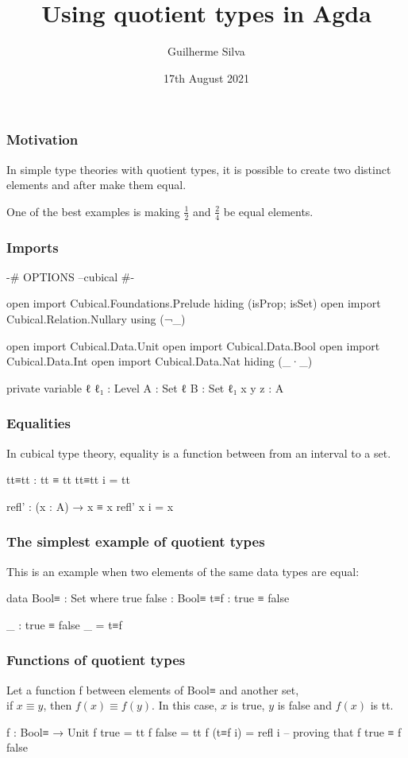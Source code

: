 \documentclass{beamer}
\title{Using quotient types in Agda}
\author{Guilherme Silva}
\institute{Scottish Programming Languages and Verification Summer School}
\date{17th August 2021}
\begin{document}
\frame{\titlepage}

\begin{frame}
  \frametitle{Motivation}
  In simple type theories with quotient types,
  it is possible to create two distinct elements and after
  make them equal.

  One of the best examples is making $ \frac{1}{2} $ and $ \frac{2}{4} $ be equal elements.
\end{frame}

\begin{frame}
  \frametitle{Imports}
  \begin{code}
  {-# OPTIONS --cubical #-}

  open import Cubical.Foundations.Prelude hiding (isProp; isSet)
  open import Cubical.Relation.Nullary using (¬_)

  open import Cubical.Data.Unit
  open import Cubical.Data.Bool
  open import Cubical.Data.Int
  open import Cubical.Data.Nat hiding (_·_)

  private variable
    ℓ ℓ₁ : Level
    A : Set ℓ
    B : Set ℓ₁
    x y z : A
  \end{code}
\end{frame}

\begin{frame}
  \frametitle{Equalities}
  In cubical type theory, equality is a function between from an interval to a set.
  \begin{code}
  tt≡tt : tt ≡ tt
  tt≡tt i = tt

  refl' : (x : A) → x ≡ x
  refl' x i = x
  \end{code}

\end{frame}

\begin{frame}
  \frametitle{The simplest example of quotient types}
  This is an example when two elements of the same data types are equal:
  \begin{code}
  data Bool≡ : Set where
    true false : Bool≡
    t≡f : true ≡ false

  _ : true ≡ false
  _ = t≡f
  \end{code}
\end{frame}

\begin{frame}
  \frametitle{Functions of quotient types}
  Let a function f between elements of Bool≡ and another set, \\
  if $ x \equiv y $, then $ f(x) \equiv f(y) $.
  In this case, $ x $ is true, $ y $ is false and $ f(x) $ is tt.
  \begin{code}
  f : Bool≡ → Unit
  f true    = tt
  f false   = tt
  f (t≡f i) = refl i -- proving that f true ≡ f false

  \end{code}

\end{frame}
\end{document}

